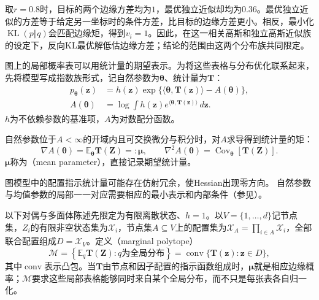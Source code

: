 取$r=0.8$时，目标的两个边缘方差均为$1$，最优独立近似却均为$0.36$。最优独立近似的方差等于给定另一坐标时的条件方差，比目标的边缘方差更小。相反，最小化$\operatorname{KL}(p\Vert q)$会匹配边缘矩，得到$v_i=1$。因此，在这一相关高斯和独立高斯近似族的设定下，反向KL最优解低估边缘方差；结论的范围由这两个分布族共同限定。

图上的局部概率表可以用统计量的期望表示。为将这些表格与分布优化联系起来，先将模型写成指数族形式，记自然参数为$\bm\theta$、统计量为$\bm T$：
\begin{equation}
  \begin{aligned}
    p_{\bm{\theta}}(\bm{z})
      &=h(\bm{z})\exp\{\langle\bm{\theta},\bm{T}(\bm{z})\rangle
                      -A(\bm{\theta})\},\\
    A(\bm{\theta})
      &=\log\int h(\bm{z})
          e^{\langle\bm{\theta},\bm{T}(\bm{z})\rangle}\,d\bm{z}.
  \end{aligned}
  \label{eq:pgm-variational-exponential-family}
\end{equation}
$h$为不依赖参数的基准项，$A$为对数配分函数。

自然参数位于$A<\infty$的开域内且可交换微分与积分时，对$A$求导得到统计量的矩：
\begin{equation}
  \nabla A(\bm{\theta})=\mathbb E_{\bm{\theta}}\bm{T}(\bm{Z})
      =:\bm{\mu},\qquad
  \nabla^2 A(\bm{\theta})
      =\operatorname{Cov}_{\bm{\theta}}[\bm{T}(\bm{Z})].
  \label{eq:pgm-variational-moments}
\end{equation}
$\bm{\mu}$称为（mean parameter），直接记录期望统计量。

图模型中的配置指示统计量可能存在仿射冗余，使Hessian出现零方向。
自然参数与均值参数的局部一一对应需要相应的最小表示和内部条件（参见）。

以下对偶与多面体陈述先限定为有限离散状态、$h=1$。以$V=\{1,\ldots,d\}$记节点集，$Z_i$的有限非空状态集为$\mathcal X_i$，节点集$A\subseteq V$上的配置集为$\mathcal X_A=\prod_{i\in A}\mathcal X_i$，全部联合配置组成$D=\mathcal X_V$。定义（marginal polytope）
\begin{equation}
  \mathcal M
    =\left\{\mathbb E_q\bm{T}(\bm{Z}):q\text{为全局分布}\right\}
    =\operatorname{conv}\{\bm{T}(\bm{z}):\bm{z}\in D\},
  \label{eq:pgm-variational-marginal-polytope}
\end{equation}
其中$\operatorname{conv}$表示凸包。当$\bm{T}$由节点和因子配置的指示函数组成时，$\bm{\mu}$就是相应边缘概率；$\mathcal M$要求这些局部表格能够同时来自某个全局分布，而不只是每张表各自归一化。


